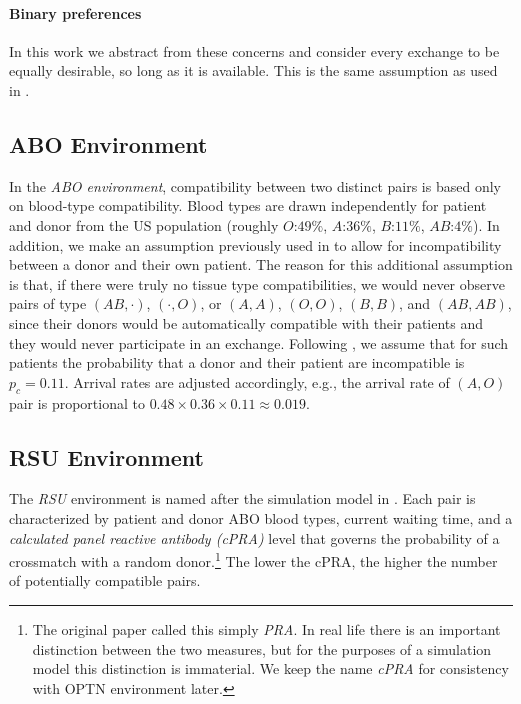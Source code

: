\documentclass[format=acmsmall, review=false]{acmart}
\begin{document}
\paragraph{Binary preferences} In this work we abstract from these concerns and consider every exchange to be equally desirable, so long as it is available. This is the same assumption as used in \cite{roth2005pairwise}. 

\subsection{ABO Environment}

In the \emph{ABO environment}, compatibility between two distinct pairs is based only on blood-type compatibility. Blood types are drawn independently for patient and donor from the US population (roughly $O$:$49\%$, $A$:$36\%$, $B$:$11\%$, $AB$:$4\%$). In addition, we make an assumption previously used in \citet{unver2010dynamic} to allow for incompatibility between a donor and their own patient. The reason for this additional assumption is that, if there were truly no tissue type compatibilities, we would never observe pairs of type $(AB,\cdot)$, $(\cdot, O)$, or $(A,A)$, $(O,O)$, $(B,B)$, and $(AB,AB)$, since their donors would be automatically compatible with their patients and they would never participate in an exchange. Following \citet{zenios2001primum}, we assume that for such patients the probability that a donor and their patient are incompatible is $p_c = 0.11$. Arrival rates are adjusted accordingly, e.g., the arrival rate of $(A,O)$ pair is proportional to $0.48 \times 0.36 \times 0.11 \approx 0.019$.

\subsection{RSU Environment}

The \emph{RSU} environment is named after the simulation model in \citet*{roth2007efficient}. Each pair is characterized by patient and donor ABO blood types, current waiting time, and a \emph{calculated panel reactive antibody (cPRA)} level that governs the probability of a crossmatch with a random donor.\footnote{The original \citet{roth2007efficient} paper called this simply \emph{PRA}. In real life there is an important distinction between the two measures, but for the purposes of a simulation model this distinction is immaterial. We keep the name \emph{cPRA} for consistency with OPTN environment later.} The lower the cPRA, the higher the number of potentially compatible pairs.
\end{document}
